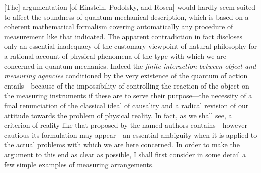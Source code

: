 \documentclass[11pt]{memoir}
\begin{document}
{[}The{]} argumentation {[}of Einstein, Podolsky, and Rosen{]} would
hardly seem suited to affect the soundness of quantum-mechanical
description, which is based on a coherent mathematical formalism
covering automatically any procedure of measurement like that indicated.
The apparent contradiction in fact discloses only an essential
inadequacy of the customary viewpoint of natural philosophy for a
rational account of physical phenomena of the type with which we are
concerned in quantum mechanics. Indeed the \emph{finite interaction
between object and measuring agencies} conditioned by the very existence
of the quantum of action entails---because of the impossibility of
controlling the reaction of the object on the measuring instruments if
these are to serve their purpose---the necessity of a final renunciation
of the classical ideal of causality and a radical revision of our
attitude towards the problem of physical reality. In fact, as we shall
see, a criterion of reality like that proposed by the named authors
contains---however cautious its formulation may appear---an essential
ambiguity when it is applied to the actual problems with which we are
here concerned. In order to make the argument to this end as clear as
possible, I shall first consider in some detail a few simple examples of
measuring arrangements.
\end{document}
